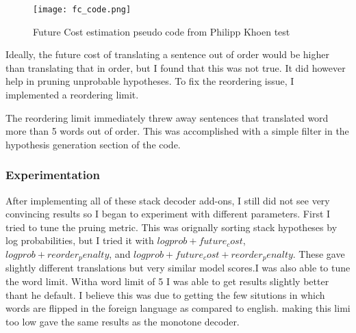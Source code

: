 \documentclass{article}
\begin{document}
\begin{figure}[!h]
\texttt{[image: fc\_code.png]}
\centering
\caption{Future Cost estimation pseudo code from Philipp Khoen test}
\end{figure}

\par
Ideally, the future cost of translating a sentence out of order would be higher than translating that in order, but I found that this was not true. It did however help in pruning unprobable hypotheses. To fix the reordering issue, I implemented a reordering limit.
\par
The reordering limit immediately threw away sentences that translated word more than 5 words out of order. This was accomplished with a simple filter in the hypothesis generation section of the code. 

\subsubsection{Experimentation}

After implementing all of these stack decoder add-ons, I still did not see very convincing results so I began to experiment with different parameters. First I tried to tune the pruing metric. This was orignally sorting stack hypotheses by log probabilities, but I tried it with $logprob + future_cost$, $logprob + reorder_penalty$, and $logprob + future_cost+ reorder_penalty$. These gave slightly different translations but very similar model scores.I was also able to tune the word limit. Witha  word limit of 5 I was able to get results slightly better thant he default. I believe this was due to getting the few situtions in which words are flipped in the foreign language as compared to english. making this limi too low gave the same results as the monotone decoder. 
\end{document}
